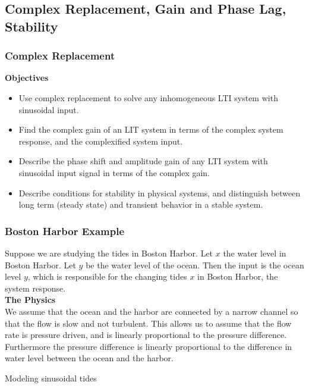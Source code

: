 \clearpage
\subsection{Complex Replacement, Gain and Phase Lag, Stability}

\subsubsection{Complex Replacement}
\textbf{\color{blue}Objectives}
\begin{itemize}
\item Use {\color{blue}complex replacement} to solve any inhomogeneous LTI
  system with {\color{blue} sinusoidal input}.
\item Find the {\color{blue}complex gain} of an LIT system in terms of
  the complex system response, and the complexified system input.
\item Describe the {\color{blue}phase shift} and {\color{blue} amplitude gain} of
  any LTI system with sinusoidal input signal in terms of the
  {\color{blue}complex gain}.
\item Describe {\color{blue}conditions for stability} in physical systems,
  and distinguish between {\color{blue}long term (steady state)} and
  {\color{blue}transient} behavior in a {\color{blue}stable} system. 
\end{itemize}
\clearpage
\subsubsection{Boston Harbor Example}

Suppose we are studying the tides in Boston Harbor.
Let $x$ the water level in Boston Harbor.
Let $y$ be the water level of the ocean.
Then the input is the ocean level $y$, which is responsible for the changing tides $x$ in Boston Harbor,
the system response.\\

\textbf{\color{blue} The Physics} \\

We assume that the ocean and the harbor are connected by a narrow channel
so that the flow is slow and not turbulent.
This allows us to assume that the flow rate is pressure driven, and is linearly proportional to the pressure difference.
Furthermore the pressure difference is linearly proportional to the difference in water level between the ocean and the harbor.

\begin{exercise}
  Modeling sinusoidal tides
\end{exercise}

